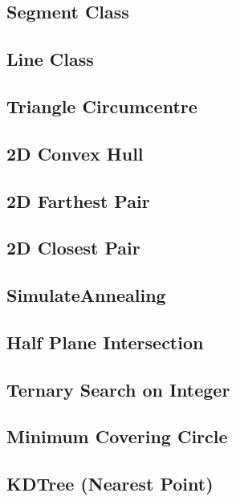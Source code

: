 \documentclass[a4paper,10pt,twocolumn,oneside]{article}
\begin{document}
\subsection{Segment Class}

\subsection{Line Class}

\subsection{Triangle Circumcentre}

\subsection{2D Convex Hull}

\subsection{2D Farthest Pair}

\subsection{2D Closest Pair}

\subsection{SimulateAnnealing}

\subsection{Half Plane Intersection}

\subsection{Ternary Search on Integer}

\subsection{Minimum Covering Circle}

\subsection{KDTree (Nearest Point)}

\end{document}
